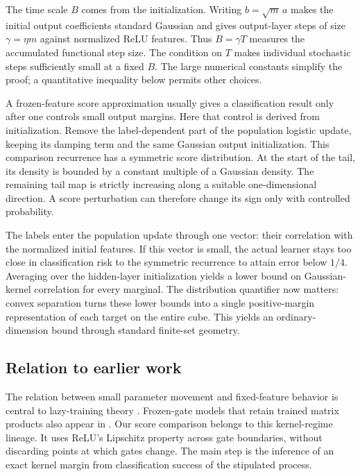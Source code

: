 \documentclass[11pt,letterpaper,pmlr,twoside]{jmlr}
\begin{document}
The time scale $B$ comes from the initialization. Writing $b=\sqrt m\,a$ makes the initial output coefficients standard Gaussian and gives output-layer steps of size $\gamma=\eta m$ against normalized ReLU features. Thus $B=\gamma T$ measures the accumulated functional step size. The condition on $T$ makes individual stochastic steps sufficiently small at a fixed $B$. The large numerical constants simplify the proof; a quantitative inequality below permits other choices.

A frozen-feature score approximation usually gives a classification result only after one controls small output margins. Here that control is derived from initialization. Remove the label-dependent part of the population logistic update, keeping its damping term and the same Gaussian output initialization. This comparison recurrence has a symmetric score distribution. At the start of the tail, its density is bounded by a constant multiple of a Gaussian density. The remaining tail map is strictly increasing along a suitable one-dimensional direction. A score perturbation can therefore change its sign only with controlled probability.

The labels enter the population update through one vector: their correlation with the normalized initial features. If this vector is small, the actual learner stays too close in classification risk to the symmetric recurrence to attain error below $1/4$. Averaging over the hidden-layer initialization yields a lower bound on Gaussian-kernel correlation for every marginal. The distribution quantifier now matters: convex separation turns these lower bounds into a single positive-margin representation of each target on the entire cube. This yields an ordinary-dimension bound through standard finite-set geometry.

\subsection{Relation to earlier work}
The relation between small parameter movement and fixed-feature behavior is central to lazy-training theory \citep{Chizat19}. Frozen-gate models that retain trained matrix products also appear in \citet[Section~6.2]{AllenZhu19}. Our score comparison belongs to this kernel-regime lineage. It uses ReLU's Lipschitz property across gate boundaries, without discarding points at which gates change. The main step is the inference of an exact kernel margin from classification success of the stipulated process.
\end{document}

